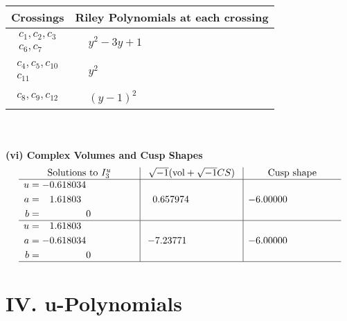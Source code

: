 \documentclass[1p]{elsarticle_modified}
\theoremstyle{definition}
\newcommand{\I}{\sqrt{-1}}
\begin{document}
\begin{tabular}{m{50pt}|m{274pt}}
Crossings & \hspace{64pt}Riley Polynomials at each crossing \\
\hline $$\begin{aligned}c_{1},c_{2},c_{3}\\c_{6},c_{7}\end{aligned}$$&$\begin{aligned}
&y^2-3 y+1
\end{aligned}$\\
\hline $$\begin{aligned}c_{4},c_{5},c_{10}\\c_{11}\end{aligned}$$&$\begin{aligned}
&y^2
\end{aligned}$\\
\hline $$\begin{aligned}c_{8},c_{9},c_{12}\end{aligned}$$&$\begin{aligned}
&(y-1)^2
\end{aligned}$\\
\hline
\end{tabular}\\~\\
\newpage\flushleft \textbf{(vi) Complex Volumes and Cusp Shapes}
$$\begin{array}{c|c|c}  
\text{Solutions to }I^u_{3}& \I (\text{vol} + \sqrt{-1}CS) & \text{Cusp shape}\\
 \hline 
\begin{aligned}
u &= -0.618034\phantom{ +0.000000I} \\
a &= \phantom{-}1.61803\phantom{ +0.000000I} \\
b &= \phantom{-0.000000 } 0\end{aligned}
 & \phantom{-}0.657974\phantom{ +0.000000I} & -6.00000\phantom{ +0.000000I} \\ \hline\begin{aligned}
u &= \phantom{-}1.61803\phantom{ +0.000000I} \\
a &= -0.618034\phantom{ +0.000000I} \\
b &= \phantom{-0.000000 } 0\end{aligned}
 & -7.23771\phantom{ +0.000000I} & -6.00000\phantom{ +0.000000I}\\
 \hline 
 \end{array}$$\newpage
\newpage\renewcommand{\arraystretch}{1}
\centering \section*{ IV. u-Polynomials}
\end{document}
